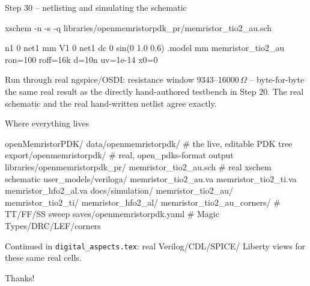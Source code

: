 \documentclass[aspectratio=169]{beamer}
\begin{document}
\begin{frame}[fragile]{Step 30 -- netlisting and simulating the schematic}
\begin{cli}
xschem -n -s -q libraries/openmemristorpdk_pr/memristor_tio2_au.sch
\end{cli}
\begin{va}
n1 0 net1 mm
V1 0 net1 dc 0 sin(0 1.0 0.6)
.model mm memristor_tio2_au ron=100 roff=16k d=10n uv=1e-14 x0=0
\end{va}
Run through real ngspice/OSDI: resistance window
9343--16000\,$\Omega$ -- byte-for-byte the same real result as the
directly hand-authored testbench in Step 20. The real schematic and
the real hand-written netlist agree exactly.
\end{frame}

\begin{frame}[fragile]{Where everything lives}
\begin{cli}
openMemristorPDK/
  data/openmemristorpdk/               # the live, editable PDK tree
  export/openmemristorpdk/             # real, open_pdks-format output
  libraries/openmemristorpdk_pr/
    memristor_tio2_au.sch              # real xschem schematic
  user_models/veriloga/
    memristor_tio2_au.va  memristor_tio2_ti.va  memristor_hfo2_al.va
  docs/simulation/
    memristor_tio2_au/  memristor_tio2_ti/  memristor_hfo2_al/
    memristor_tio2_au_corners/         # TT/FF/SS sweep
  saves/openmemristorpdk.yaml          # Magic Types/DRC/LEF/corners
\end{cli}
Continued in \texttt{digital\_aspects.tex}: real Verilog/CDL/SPICE/
Liberty views for these same real cells.
\end{frame}

\begin{frame}
\centering\Large Thanks!
\end{frame}
\end{document}
